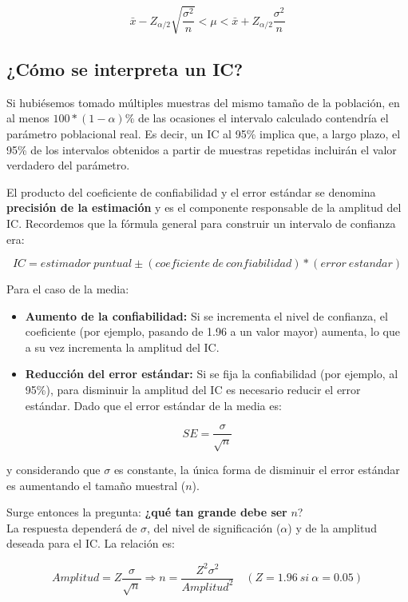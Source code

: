\documentclass[
  spanish,
  a4paper,
]{scrbook}
\begin{document}
\[ 
\bar{x} - Z_{\alpha/2}\sqrt{\frac{\sigma^2}{n}} < \mu < \bar{x} + Z_{\alpha/2}\frac{\sigma^2}{n}   
\]

\subsection{¿Cómo se interpreta un
IC?}\label{cuxf3mo-se-interpreta-un-ic}

Si hubiésemos tomado múltiples muestras del mismo tamaño de la
población, en al menos \(100 * (1 − \alpha)\%\) de las ocasiones el
intervalo calculado contendría el parámetro poblacional real. Es decir,
un IC al 95\% implica que, a largo plazo, el 95\% de los intervalos
obtenidos a partir de muestras repetidas incluirán el valor verdadero
del parámetro.

El producto del coeficiente de confiabilidad y el error estándar se
denomina \textbf{precisión de la estimación} y es el componente
responsable de la amplitud del IC. Recordemos que la fórmula general
para construir un intervalo de confianza era:

\[ 
IC = estimador~puntual \pm (coeficiente~de~confiabilidad) * (error~ estandar) 
\]

Para el caso de la media:

\begin{itemize}
\item
  \textbf{Aumento de la confiabilidad:} Si se incrementa el nivel de
  confianza, el coeficiente (por ejemplo, pasando de 1.96 a un valor
  mayor) aumenta, lo que a su vez incrementa la amplitud del IC.
\item
  \textbf{Reducción del error estándar:} Si se fija la confiabilidad
  (por ejemplo, al 95\%), para disminuir la amplitud del IC es necesario
  reducir el error estándar. Dado que el error estándar de la media es:
\end{itemize}

\[
   SE = \frac{\sigma}{\sqrt{n}} 
\]

y considerando que \(\sigma\) es constante, la única forma de disminuir
el error estándar es aumentando el tamaño muestral (\(n\)).

Surge entonces la pregunta: \textbf{¿qué tan grande debe ser} \(n\)?\\
La respuesta dependerá de \(\sigma\), del nivel de significación
(\(\alpha\)) y de la amplitud deseada para el IC. La relación es:

\[ 
Amplitud = Z \frac{\sigma}{\sqrt{n}} \Longrightarrow n = \frac{Z^2\sigma^2}{Amplitud^2} \quad (Z = 1.96~si~\alpha = 0.05) 
\]
\end{document}
